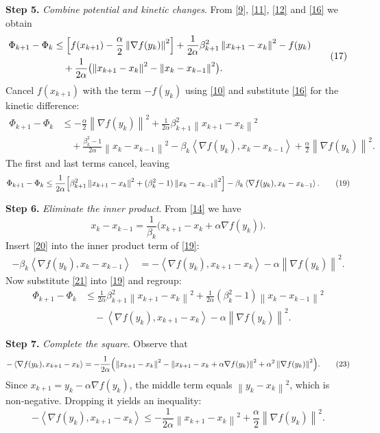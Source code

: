 \documentclass[11pt]{article}
\newcommand{\norm}[1]{\left\|#1\right\|}
\newcommand{\inner}[2]{\left\langle #1,#2\right\rangle}
\newcommand{\grad}{\nabla}
\begin{document}
\noindent\textbf{Step 5.} \emph{Combine potential and kinetic changes}.  
From \eqref{9}, \eqref{11}, \eqref{12} and \eqref{16} we obtain
\[
\begin{aligned}
\Phi_{k+1} - \Phi_k
&\le \Bigl[f(x_{k+1})-\frac{\alpha}{2}\norm{\grad f(y_k)}^{2}\Bigr]
   +\frac{1}{2\alpha}\beta_{k+1}^{2}\norm{x_{k+1}-x_k}^{2}
   -f(y_k)\\
&\quad +\frac{1}{2\alpha}\bigl(\norm{x_{k+1}-x_k}^{2}
      -\norm{x_k-x_{k-1}}^{2}\bigr).
\end{aligned}
\tag{17}
\]
Cancel $f(x_{k+1})$ with the term $-f(y_k)$ using \eqref{10} and substitute \eqref{16} for the kinetic difference:
\[
\begin{aligned}
\Phi_{k+1} - \Phi_k
&\le -\frac{\alpha}{2}\norm{\grad f(y_k)}^{2}
   +\frac{1}{2\alpha}\beta_{k+1}^{2}\norm{x_{k+1}-x_k}^{2}\\
&\quad+ \frac{\beta_k^{2}-1}{2\alpha}\norm{x_k-x_{k-1}}^{2}
   -\beta_k\inner{\grad f(y_k)}{x_k-x_{k-1}}
   +\frac{\alpha}{2}\norm{\grad f(y_k)}^{2}.
\end{aligned}
\tag{18}
\]
The first and last terms cancel, leaving
\[
\Phi_{k+1} - \Phi_k
\le \frac{1}{2\alpha}\Bigl[\beta_{k+1}^{2}\norm{x_{k+1}-x_k}^{2}
   +(\beta_k^{2}-1)\norm{x_k-x_{k-1}}^{2}\Bigr]
   -\beta_k\inner{\grad f(y_k)}{x_k-x_{k-1}} .
\tag{19}
\]

\noindent\textbf{Step 6.} \emph{Eliminate the inner product}.  
From \eqref{14} we have
\[
x_k-x_{k-1}= \frac{1}{\beta_k}\bigl(x_{k+1}-x_k+\alpha\grad f(y_k)\bigr).
\tag{20}
\]
Insert \eqref{20} into the inner product term of \eqref{19}:
\[
\begin{aligned}
-\beta_k\inner{\grad f(y_k)}{x_k-x_{k-1}}
&= -\inner{\grad f(y_k)}{x_{k+1}-x_k}
   -\alpha\norm{\grad f(y_k)}^{2}.
\end{aligned}
\tag{21}
\]
Now substitute \eqref{21} into \eqref{19} and regroup:
\[
\begin{aligned}
\Phi_{k+1} - \Phi_k
&\le \frac{1}{2\alpha}\beta_{k+1}^{2}\norm{x_{k+1}-x_k}^{2}
   +\frac{1}{2\alpha}(\beta_k^{2}-1)\norm{x_k-x_{k-1}}^{2}\\
&\quad -\inner{\grad f(y_k)}{x_{k+1}-x_k}
   -\alpha\norm{\grad f(y_k)}^{2}.
\end{aligned}
\tag{22}
\]

\noindent\textbf{Step 7.} \emph{Complete the square}.  
Observe that
\[
-\inner{\grad f(y_k)}{x_{k+1}-x_k}
= -\frac{1}{2\alpha}\Bigl(\norm{x_{k+1}-x_k}^{2}
    -\norm{x_{k+1}-x_k+\alpha\grad f(y_k)}^{2}
    +\alpha^{2}\norm{\grad f(y_k)}^{2}\Bigr).
\tag{23}
\]
Since $x_{k+1}=y_k-\alpha\grad f(y_k)$, the middle term equals $\norm{y_k-x_k}^{2}$, which is non‑negative. Dropping it yields an inequality:
\[
-\inner{\grad f(y_k)}{x_{k+1}-x_k}
\le -\frac{1}{2\alpha}\norm{x_{k+1}-x_k}^{2}
   +\frac{\alpha}{2}\norm{\grad f(y_k)}^{2}.
\tag{24}
\]
\end{document}
